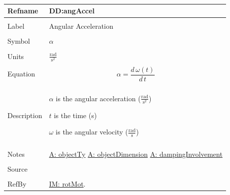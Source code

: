 \documentclass[12pt]{article}
\begin{document}
~\newline
 \noindent \begin{minipage}{\textwidth}
\begin{tabular}{p{} p{}}
\toprule \textbf{Refname} & \textbf{DD:angAccel}
\label{DD:angAccel}
\\ \midrule \\
Label & Angular Acceleration
        \\ \midrule \\
        Symbol & $α$
                 \\ \midrule \\
                 Units & $\frac{\text{rad}}{\text{s}^{2}}$
                         \\ \midrule \\
                         Equation & \begin{displaymath}
                                    α=\frac{d\,ω\left(t\right)}{d\,t}
                                    \end{displaymath}
                                    \\ \midrule \\
                                    Description & \begin{symbDescription}
                                                  \item{$α$ is the angular acceleration ($\frac{\text{rad}}{\text{s}^{2}}$)}
                                                  \item{$t$ is the time (s)}
                                                  \item{$ω$ is the angular velocity ($\frac{\text{rad}}{\text{s}}$)}
                                                  \end{symbDescription}
                                                  \\ \midrule \\
                                                  Notes & \hyperref[A:objectTy]{A: objectTy}
                                                          \hyperref[A:objectDimension]{A: objectDimension}
                                                          \hyperref[A:dampingInvolvement]{A: dampingInvolvement}
                                                          \\ \midrule \\
                                                          Source & \\ \midrule \\
                                                                   RefBy & \hyperref[IM:rotMot]{IM: rotMot}.
\\ \bottomrule \end{tabular}
\end{minipage}\\
\end{document}
